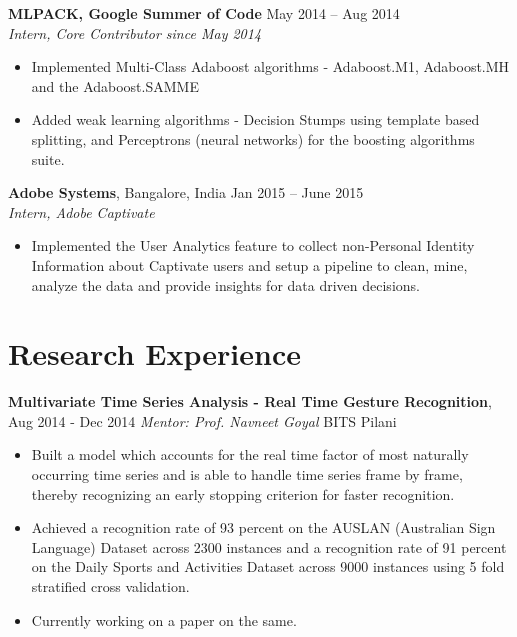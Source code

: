 \documentclass[letterpaper]{article}
\begin{document}
\vspace{-0.5mm}
\textbf{MLPACK, Google Summer of Code} \hfill May 2014 -- Aug 2014\\
\emph{Intern, Core Contributor since May 2014}\\
\vspace{-6mm}
\begin{itemize}
\item Implemented Multi-Class Adaboost algorithms - Adaboost.M1, Adaboost.MH and the Adaboost.SAMME
\vspace{-2mm}
\item Added weak learning algorithms - Decision Stumps using template based splitting, and Perceptrons (neural networks) for the boosting algorithms suite.
\end{itemize}

\vspace{-0.5mm}
\textbf{Adobe Systems}, Bangalore, India \hfill Jan 2015 -- June 2015\\
\emph{Intern, Adobe Captivate}\\
\vspace{-6mm}
\begin{itemize}
\item Implemented the User Analytics feature to collect non-Personal Identity Information about Captivate users and setup a pipeline to clean, mine, analyze the data and provide insights for data driven decisions.
\end{itemize}

\section*{Research Experience}
\textbf{Multivariate Time Series Analysis - Real Time Gesture Recognition},  \hfill
Aug 2014 - Dec 2014
\emph{Mentor: Prof. Navneet Goyal} \hfill
BITS Pilani\\
\vspace{-6mm}
\begin{itemize}
\item Built a model which accounts for the real time factor of most naturally occurring time series and is able to handle time series frame by frame, thereby recognizing an early stopping criterion for faster recognition. 
\vspace{-2mm}
\item Achieved a recognition rate of 93 percent on the AUSLAN (Australian Sign Language) Dataset across 2300 instances and a recognition rate of 91 percent on the Daily Sports and Activities Dataset across 9000 instances using 5 fold stratified cross validation.
\vspace{-2mm}
\item Currently working on a paper on the same.
\end{itemize}
\end{document}
